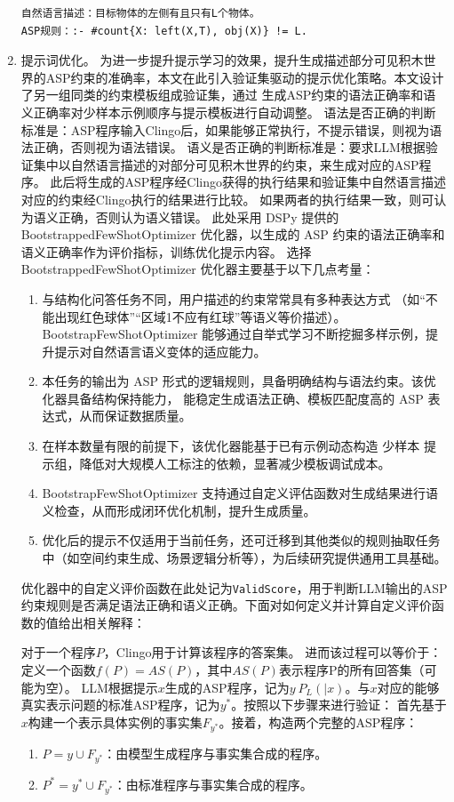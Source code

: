 \begin{enumerate}[nosep]
\begin{lstlisting}
自然语言描述：目标物体的左侧有且只有L个物体。
ASP规则：:- #count{X: left(X,T), obj(X)} != L.
\end{lstlisting}
\item 提示词优化。
为进一步提升提示学习的效果，提升生成描述部分可见积木世界的ASP约束的准确率，本文在此引入验证集驱动的提示优化策略。本文设计了另一组同类的约束模板组成验证集，通过
生成ASP约束的语法正确率和语义正确率对少样本示例顺序与提示模板进行自动调整。
语法是否正确的判断标准是：ASP程序输入Clingo后，如果能够正常执行，不提示错误，则视为语法正确，否则视为语法错误。
语义是否正确的判断标准是：要求LLM根据验证集中以自然语言描述的对部分可见积木世界的约束，来生成对应的ASP程序。
此后将生成的ASP程序经Clingo获得的执行结果和验证集中自然语言描述对应的约束经Clingo执行的结果进行比较。
如果两者的执行结果一致，则可认为语义正确，否则认为语义错误。
此处采用 DSPy 提供的 BootstrappedFewShotOptimizer 优化器，以生成的 ASP 约束的语法正确率和语义正确率作为评价指标，训练优化提示内容。
选择 BootstrappedFewShotOptimizer 优化器主要基于以下几点考量：
\begin{enumerate}[nosep]
\item 与结构化问答任务不同，用户描述的约束常常具有多种表达方式
（如“不能出现红色球体”“区域1不应有红球”等语义等价描述）。BootstrapFewShotOptimizer 
能够通过自举式学习不断挖掘多样示例，提升提示对自然语言语义变体的适应能力。
\item 本任务的输出为 ASP 形式的逻辑规则，具备明确结构与语法约束。该优化器具备结构保持能力，
能稳定生成语法正确、模板匹配度高的 ASP 表达式，从而保证数据质量。
\item 在样本数量有限的前提下，该优化器能基于已有示例动态构造 少样本 提示组，降低对大规模人工标注的依赖，显著减少模板调试成本。
\item BootstrapFewShotOptimizer 支持通过自定义评估函数对生成结果进行语义检查，从而形成闭环优化机制，提升生成质量。
\item 优化后的提示不仅适用于当前任务，还可迁移到其他类似的规则抽取任务中（如空间约束生成、场景逻辑分析等），为后续研究提供通用工具基础。
\end{enumerate}

优化器中的自定义评价函数在此处记为\texttt{ValidScore}，用于判断LLM输出的ASP约束规则是否满足语法正确和语义正确。下面对如何定义并计算自定义评价函数的值给出相关解释：

对于一个程序$P$，Clingo用于计算该程序的答案集。
进而该过程可以等价于：定义一个函数$f(P) = AS(P)$，其中$AS(P)$表示程序P的所有回答集（可能为空）。
LLM根据提示$x$生成的ASP程序，记为$y ~ P_L(|x)$。与$x$对应的能够真实表示问题的标准ASP程序，记为$y^*$。按照以下步骤来进行验证：
首先基于$x$构建一个表示具体实例的事实集$F_{y^*}$。接着，构造两个完整的ASP程序：
\begin{enumerate}[nosep]
\item $P = y \cup F_{y^*}$：由模型生成程序与事实集合成的程序。
\item $P^* = y^* \cup F_{y^*}$：由标准程序与事实集合成的程序。
\end{enumerate}


\end{enumerate}
